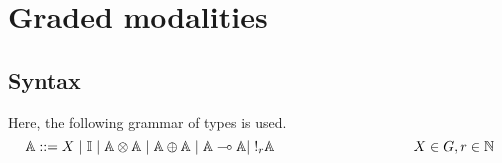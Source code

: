 \chapter{Graded modalities}



\section{Syntax}

Here, the following grammar of types is used.
\begin{equation*} \label{eq:grammar_graded}
  \centering
   \mathbb{A} ::= X  \hspace{3 pt} \vert \hspace{3 pt} \mathbb{I}  \hspace{3 pt}  \vert \hspace{3 pt} \mathbb{A}  \otimes  \mathbb{A} \hspace{3 pt} \vert \hspace{3 pt} \mathbb{A} \oplus \mathbb{A} \hspace{3 pt}  \vert \hspace{3 pt}   \mathbb{A} \multimap  \mathbb{A} \vert \hspace{3 pt} !_{r} \mathbb{A} \hspace{100pt} {X \in G,r \in \mathbb{N}} 
  \end{equation*}


